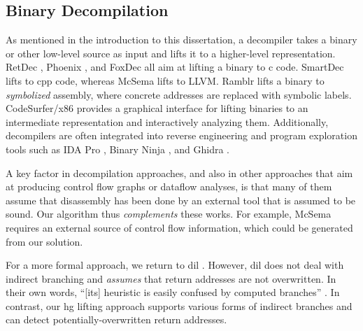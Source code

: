\subsection{Binary Decompilation}\label{related-decompilation}

As mentioned in the introduction to this dissertation, a decompiler takes a binary or other low-level source as input and lifts it to a higher-level representation.
RetDec \autocite{retdec}, Phoenix \autocite{brumley2013native}, and FoxDec \autocite{verbeek2020sound} all aim at lifting a binary to \gls{c} code.
SmartDec \autocite{fokin2011smartdec} lifts to \gls{cpp} code, whereas McSema \autocite{dinaburg2014mcsema} lifts to LLVM.
Ramblr \autocite{wang2017ramblr} lifts a binary to \emph{symbolized} assembly, where concrete addresses are replaced with symbolic labels.
CodeSurfer/\gls{x86} \autocite{balakrishnan2004analyzing,balakrishnan2005codesurfer}
provides a graphical interface for lifting binaries to an intermediate representation and interactively analyzing them.
Additionally, decompilers are often integrated into reverse engineering and program exploration tools such as IDA Pro \autocite{ida-decompiler},
Binary Ninja \autocite{binary-ninja-decompiler}, and Ghidra \autocite{ghidra}.

A key factor in decompilation approaches, and also in other approaches that aim at producing control flow graphs or dataflow analyses, is that many of them assume that disassembly has been done by an external tool that is assumed to be sound.
Our algorithm thus \emph{complements} these works.
For example, McSema requires an external source of control flow information, which could be generated from our solution.

For a more formal approach, we return to \ac{dil} \autocite{myreen2007hoare,myreen2012dil}.
However, \ac{dil} does not deal with indirect branching and \emph{assumes} that return addresses are not overwritten.
In their own words, ``[its] heuristic is easily confused by computed branches'' \autocite{myreen2008dil}.
In contrast, our \ac{hg} lifting approach supports various forms of indirect branches and can detect potentially-overwritten return addresses.

